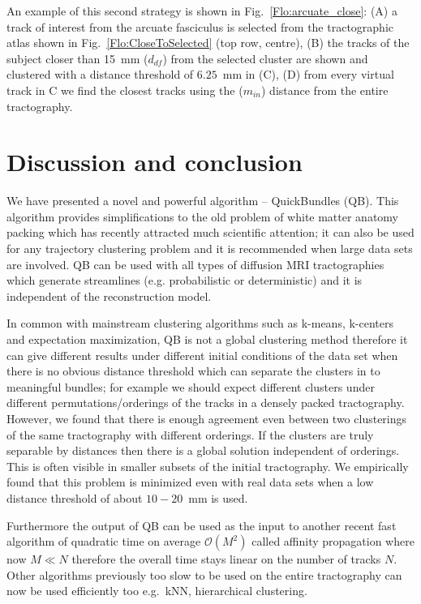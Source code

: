 \documentclass[preprint,authoryear,a4paper,10pt,onecolumn]{elsarticle}
\begin{document}
An example of this second strategy is shown in
Fig.~\ref{Flo:arcuate_close}: (A) a track of interest from the arcuate
fasciculus is selected from the tractographic atlas shown in
Fig.~\ref{Flo:CloseToSelected} (top row, centre), (B) the tracks of the
subject closer than 15~mm ($d_{df}$) from the selected cluster are shown
and clustered with a distance threshold of $6.25$~mm in (C), (D) from
every virtual track in C we find the closest tracks using the
($m_{in}$) distance from the entire tractography.


\section{Discussion and conclusion}

We have presented a novel and powerful algorithm --
QuickBundles (QB). This algorithm provides simplifications to the old
problem of white matter anatomy packing which has recently attracted
much scientific attention; it can also be used for any trajectory
clustering problem and it is recommended when large data sets are
involved. QB can be used with all types of diffusion MRI tractographies
which generate streamlines (e.g. probabilistic or deterministic) and it
is independent of the reconstruction model.

In common with mainstream clustering algorithms such as k-means,
k-centers and expectation maximization, QB is not a global clustering
method therefore it can give different results under different initial
conditions of the data set when there is no obvious distance threshold
which can separate the clusters in to meaningful bundles; for example we
should expect different clusters under different permutations/orderings
of the tracks in a densely packed tractography. However, we found that
there is enough agreement even between two clusterings of the same
tractography with different orderings. If the clusters are truly
separable by distances then there is a global solution independent of
orderings. This is often visible in smaller subsets of the initial
tractography. We empirically found that this problem is minimized even
with real data sets when a low distance threshold of about $10-20$~mm is
used.

Furthermore the output of QB can be used as the input to another recent
fast algorithm of quadratic time on average $\mathcal{O}(M^{2})$ called affinity
propagation where now $M\ll N$ therefore the overall time stays linear
on the number of tracks $N$. Other algorithms previously too slow to be
used on the entire tractography can now be used efficiently too
e.g.~kNN, hierarchical clustering.
\end{document}

